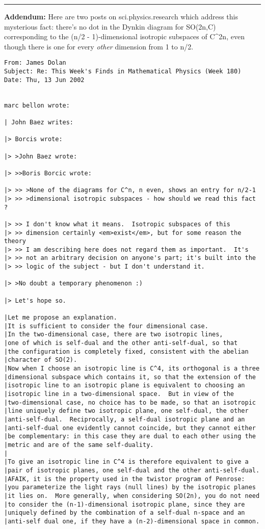 \par\noindent\rule{\textwidth}{0.4pt}
\textbf{Addendum:}
Here are two posts on sci.physics.research which address
this mysterious fact: there's no dot in the Dynkin diagram
for SO(2n,C) corresponding to the (n/2 - 1)-dimensional
isotropic subspaces of C^{2n}, even though there is
one for every \emph{other} dimension from 1 to n/2.
\begin{verbatim}
From: James Dolan
Subject: Re: This Week's Finds in Mathematical Physics (Week 180)
Date: Thu, 13 Jun 2002 


marc bellon wrote:

| John Baez writes:

|> Borcis wrote:

|> >John Baez wrote:
 
|> >>Boris Borcic wrote:
 
|> >> >None of the diagrams for C^n, n even, shows an entry for n/2-1 
|> >> >dimensional isotropic subspaces - how should we read this fact ?
 
|> >> I don't know what it means.  Isotropic subspaces of this
|> >> dimension certainly <em>exist</em>, but for some reason the theory
|> >> I am describing here does not regard them as important.  It's
|> >> not an arbitrary decision on anyone's part; it's built into the 
|> >> logic of the subject - but I don't understand it.
 
|> >No doubt a temporary phenomenon :)

|> Let's hope so.  

|Let me propose an explanation.
|It is sufficient to consider the four dimensional case.
|In the two-dimensional case, there are two isotropic lines,
|one of which is self-dual and the other anti-self-dual, so that 
|the configuration is completely fixed, consistent with the abelian 
|character of SO(2).
|Now when I choose an isotropic line is C^4, its orthogonal is a three
|dimensional subspace which contains it, so that the extension of the
|isotropic line to an isotropic plane is equivalent to choosing an 
|isotropic line in a two-dimensional space.  But in view of the 
|two-dimensional case, no choice has to be made, so that an isotropic
|line uniquely define two isotropic plane, one self-dual, the other
|anti-self-dual.  Reciprocally, a self-dual isotropic plane and an 
|anti-self-dual one evidently cannot coincide, but they cannot either 
|be complementary: in this case they are dual to each other using the 
|metric and are of the same self-duality.
|
|To give an isotropic line in C^4 is therefore equivalent to give a
|pair of isotropic planes, one self-dual and the other anti-self-dual.
|AFAIK, it is the property used in the twistor program of Penrose:
|you parameterize the light rays (null lines) by the isotropic planes
|it lies on.  More generally, when considering SO(2n), you do not need 
|to consider the (n-1)-dimensional isotropic plane, since they are 
|uniquely defined by the combination of a self-dual n-space and an
|anti-self dual one, if they have a (n-2)-dimensional space in common.



\end{verbatim}
